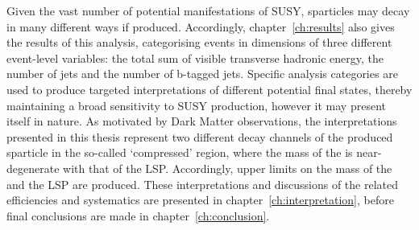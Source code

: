 Given the vast number of potential manifestations of SUSY, sparticles may
decay in many different ways if produced. Accordingly, chapter~\ref{ch:results}
also gives the results of this analysis, categorising events in dimensions
of three different event-level variables: the total sum of visible transverse
hadronic energy, the number of jets and the number of b-tagged jets.
Specific analysis categories are used to produce targeted
interpretations of different potential final states, thereby maintaining a broad
sensitivity to SUSY production, however it may present itself in nature. As
motivated by Dark Matter observations, the interpretations presented in this
thesis represent two different decay channels of the produced \sTop
sparticle in the so-called `compressed' region, where the mass of the \sTop is
near-degenerate with that of the LSP. Accordingly, upper limits on the mass of
the \sTop and the LSP are produced. These interpretations
and discussions of the related efficiencies and systematics are presented in
chapter~\ref{ch:interpretation}, before final conclusions are made in
chapter~\ref{ch:conclusion}.

